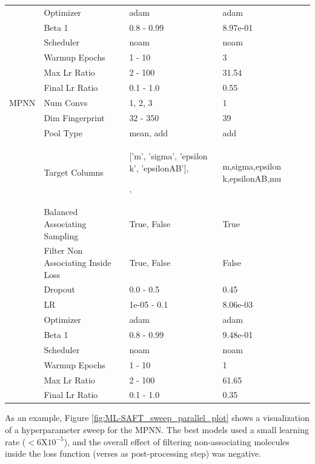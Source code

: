 \begin{table}
\begin{center}
\begin{tabular}{lp{}p{}l}
			 & Optimizer & adam & adam \\
			 & Beta 1 & 0.8 - 0.99 & 8.97e-01 \\
			 & Scheduler & noam & noam \\
			 & Warmup Epochs & 1 - 10 & 3 \\
			 & Max Lr Ratio & 2 - 100 & 31.54 \\
			 & Final Lr Ratio & 0.1 - 1.0 & 0.55 \\
			MPNN & Num Convs & 1, 2, 3 & 1 \\
			 & Dim Fingerprint & 32 - 350 & 39 \\
			 & Pool Type & mean, add & add \\
			 & Target Columns & ['m', 'sigma', 'epsilon k', 'epsilonAB'],\par['m', 'sigma', 'epsilon k', 'epsilonAB', 'KAB'],\par['m', 'sigma', 'epsilon k', 'epsilonAB', 'mu'] & m,sigma,epsilon k,epsilonAB,mu \\
			 & Balanced Associating Sampling & True, False & True \\
			 & Filter Non Associating Inside Loss & True, False & False \\
			 & Dropout & 0.0 - 0.5 & 0.45 \\
			 & LR & 1e-05 - 0.1 & 8.06e-03 \\
			 & Optimizer & adam & adam \\
			 & Beta 1 & 0.8 - 0.99 & 9.48e-01 \\
			 & Scheduler & noam & noam \\
			 & Warmup Epochs & 1 - 10 & 1 \\
			 & Max Lr Ratio & 2 - 100 & 61.65 \\
			 & Final Lr Ratio & 0.1 - 1.0 & 0.35 \\
		\end{tabular}
	\end{center}
	\label{tab:hyperparameters}
\end{table}

As an example, Figure \ref{fig:ML-SAFT_sweep_parallel_plot} shows a visualization of a hyperparameter sweep for the MPNN. The best models used a small learning rate ($<6\text{X}  10^{-5}$), and the overall effect of filtering non-associating molecules inside the loss function (verses as post-processing step) was negative.

